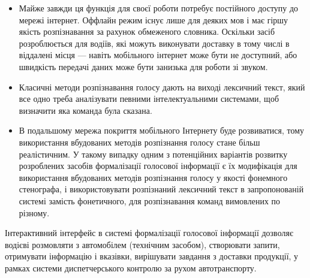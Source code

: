 \begin{itemize}
	\item Майже завжди ця функція для своєї роботи потребує постійного доступу до мережі інтернет. Оффлайн режим існує лише для деяких мов і має гіршу якість розпізнавання за рахунок обмеженого словника. Оскільки засіб розроблюється для водіїв, які можуть виконувати доставку в тому числі в віддалені місця --- навіть мобільного інтернет може бути не доступний, або швидкість передачі даних може бути занизька для роботи зі звуком.
	\item Класичні методи розпізнавання голосу дають на виході лексичний текст, який все одно треба аналізувати певними інтелектуальними системами, щоб визначити яка команда була сказана.
	\item В подальшому мережа покриття мобільного Інтернету буде розвиватися, тому використання вбудованих методів розпізнання голосу стане більш реалістичним. У такому випадку одним з потенційних варіантів розвитку розроблених засобів формалізації голосової інформації є їх модифікація для використання вбудованих методів розпізнання голосу у якості фонемного стенографа, і використовувати розпізнаний лексичний текст в запропонованій системі замість фонетичного, для розпізнавання команд вимовлених по різному.
\end{itemize}

Інтерактивний інтерфейс в системі формалізації голосової інформації дозволяє водієві розмовляти з автомобілем (технічним засобом), створювати запити, отримувати інформацію і вказівки, вирішувати завдання з доставки продукції, у рамках системи диспетчерського контролю за рухом автотранспорту.


